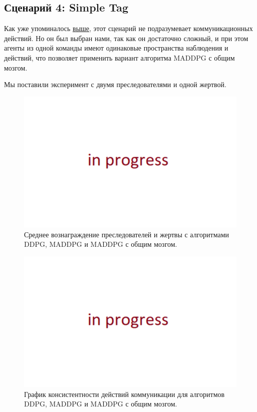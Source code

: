\subsection{Сценарий 4: Simple Tag}

Как уже упоминалось \hyperref[exp-st]{выше}, этот сценарий не подразумевает коммуникационных действий. Но он был выбран нами, так как он достаточно сложный, и при этом агенты из одной команды имеют одинаковые пространства наблюдения и действий, что позволяет применить вариант алгоритма MADDPG с общим мозгом.

Мы поставили эксперимент с двумя преследователями и одной жертвой.

\begin{figure}[ht!]
	\center
	\includegraphics [scale=0.6] {my_folder/images/in_progress.png}
	\caption{Среднее вознаграждение преследователей и жертвы с алгоритмами DDPG, MADDPG и MADDPG с общим мозгом.}
	\label{fig:result-st-rew}
\end{figure}

\begin{figure}[ht!]
	\center
	\includegraphics [scale=0.6] {my_folder/images/in_progress.png}
	\caption{График консистентности действий коммуникации для алгоритмов DDPG, MADDPG и MADDPG с общим мозгом.}
	\label{fig:result-st-4vs2-rew}
\end{figure}

